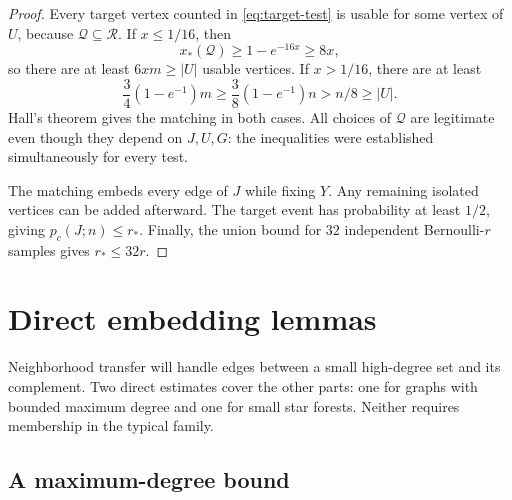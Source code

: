 \documentclass[11pt]{article}
\theoremstyle{remark}
\numberwithin{equation}{section}
\newcommand{\calQ}{\mathcal Q}
\newcommand{\calR}{\mathcal R}
\begin{document}
\begin{proof}
Every target vertex counted in \eqref{eq:target-test} is usable
for some vertex of $U$, because $\calQ\subseteq\calR$.
If $x\leq1/16$, then
\[
 x_*(\calQ)\geq1-e^{-16x}\geq8x,
\]
so there are at least $6xm\geq|U|$ usable vertices.
If $x>1/16$, there are at least
\[
 \frac34(1-e^{-1})m\geq\frac38(1-e^{-1})n>n/8\geq|U|.
\]
Hall's theorem \cite{Hall35} gives the matching in both cases.
All choices of $\calQ$ are legitimate even though they depend
on $J,U,G$: the inequalities were established simultaneously
for every test.

The matching embeds every edge of $J$ while fixing $Y$.
Any remaining isolated vertices can be added afterward. The
target event has probability at least $1/2$, giving
$p_c(J;n)\leq r_*$. Finally, the union bound for $32$ independent
Bernoulli-$r$ samples gives $r_*\leq32r$.
\end{proof}

\section{Direct embedding lemmas}
\label{sec:direct}

Neighborhood transfer will handle edges between a small
high-degree set and its complement. Two direct estimates cover the other parts:
one for graphs with bounded maximum degree and one for small
star forests. Neither requires membership in the typical family.

\subsection{A maximum-degree bound}
\end{document}
